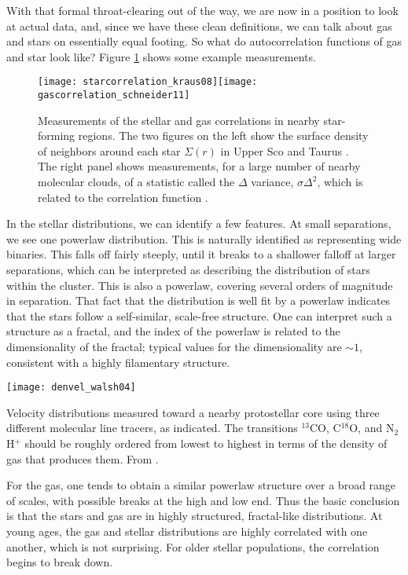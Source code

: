 With that formal throat-clearing out of the way, we are now in a position to look at actual data, and, since we have these clean definitions, we can talk about gas and stars on essentially equal footing. So what do autocorrelation functions of gas and star look like? Figure \ref{fig:correlation_stargas} shows some example measurements.

\begin{figure}
\texttt{[image: starcorrelation\_kraus08]}\texttt{[image: gascorrelation\_schneider11]}
\caption[Correlation functions for gas and stars]{
\label{fig:correlation_stargas}
Measurements of the stellar and gas correlations in nearby star-forming regions. The two figures on the left show the surface density of neighbors around each star $\Sigma(r)$ in Upper Sco and Taurus \citep{kraus08a}. The right panel shows measurements, for a large number of nearby molecular clouds, of a statistic called the $\Delta$ variance, $\sigma \Delta^2$, which is related to the correlation function \citep{schneider11a}.
}
\end{figure}

In the stellar distributions, we can identify a few features. At small separations, we see one powerlaw distribution. This is naturally identified as representing wide binaries. This falls off fairly steeply, until it breaks to a shallower falloff at larger separations, which can be interpreted as describing the distribution of stars within the cluster. This is also a powerlaw, covering several orders of magnitude in separation. That fact that the distribution is well fit by a powerlaw indicates that the stars follow a self-similar, scale-free structure. One can interpret such a structure as a fractal, and the index of the powerlaw is related to the dimensionality of the fractal; typical values for the dimensionality are $\sim 1$, consistent with a highly filamentary structure.

\begin{marginfigure}
\texttt{[image: denvel\_walsh04]}
\caption[Velocity distributions in varying molecular lines]{
\label{fig:denvel_walsh04}
Velocity distributions measured toward a nearby protostellar core using three different molecular line tracers, as indicated. The transitions $^{13}$CO, C$^{18}$O, and N$_2$H$^+$ should be roughly ordered from lowest to highest in terms of the density of gas that produces them. From \citet{walsh04a}.
}
\end{marginfigure}

For the gas, one tends to obtain a similar powerlaw structure over a broad range of scales, with possible breaks at the high and low end. Thus the basic conclusion is that the stars and gas are in highly structured, fractal-like distributions. At young ages, the gas and stellar distributions are highly correlated with one another, which is not surprising. For older stellar populations, the correlation begins to break down.

